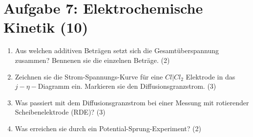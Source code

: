 \newpage
\section*{Aufgabe 7: Elektrochemische Kinetik (10)}
\begin{enumerate}

\item Aus welchen additiven Beträgen setzt sich die Gesamtüberspannung zusammen? Bennenen
sie die einzelnen Beträge. (2)

\item Zeichnen sie die Strom-Spannungs-Kurve für eine \(Cl|Cl_2\) Elektrode in das
\(j-\eta-\)Diagramm ein. Markieren sie den Diffusionsgranzstrom. (3)

\item Was passiert mit dem Diffusionsgranzstrom bei einer Messung mit rotierender
Scheibenelektrode (RDE)? (3)

\item Was erreichen sie durch ein Potential-Sprung-Experiment? (2)

\end{enumerate}